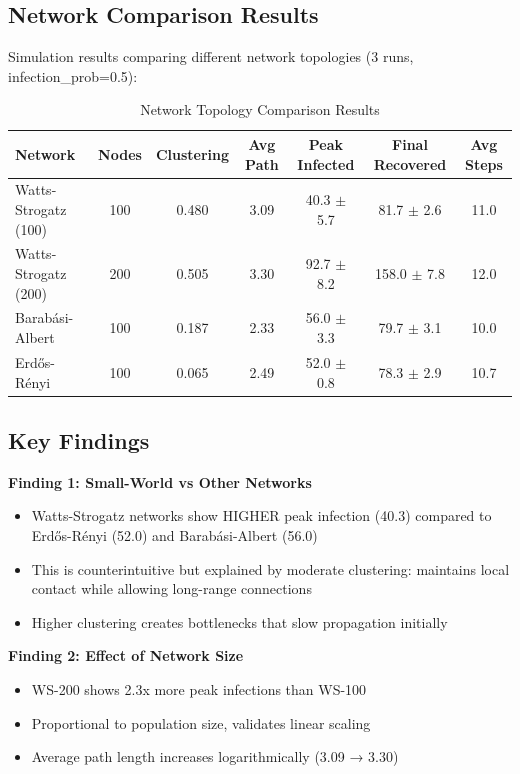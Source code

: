 \documentclass[12pt,a4paper]{article}
\begin{document}
\subsection{Network Comparison Results}

Simulation results comparing different network topologies (3 runs, infection\_prob=0.5):

\begin{table}[h]
\centering
\begin{tabular}{lcccccc}
\toprule
\textbf{Network} & \textbf{Nodes} & \textbf{Clustering} & \textbf{Avg Path} & \textbf{Peak Infected} & \textbf{Final Recovered} & \textbf{Avg Steps} \\
\midrule
Watts-Strogatz (100) & 100 & 0.480 & 3.09 & 40.3 $\pm$ 5.7 & 81.7 $\pm$ 2.6 & 11.0 \\
Watts-Strogatz (200) & 200 & 0.505 & 3.30 & 92.7 $\pm$ 8.2 & 158.0 $\pm$ 7.8 & 12.0 \\
Barabási-Albert & 100 & 0.187 & 2.33 & 56.0 $\pm$ 3.3 & 79.7 $\pm$ 3.1 & 10.0 \\
Erdős-Rényi & 100 & 0.065 & 2.49 & 52.0 $\pm$ 0.8 & 78.3 $\pm$ 2.9 & 10.7 \\
\bottomrule
\end{tabular}
\caption{Network Topology Comparison Results}
\end{table}

\subsection{Key Findings}

\textbf{Finding 1: Small-World vs Other Networks}
\begin{itemize}
    \item Watts-Strogatz networks show HIGHER peak infection (40.3) compared to Erdős-Rényi (52.0) and Barabási-Albert (56.0)
    \item This is counterintuitive but explained by moderate clustering: maintains local contact while allowing long-range connections
    \item Higher clustering creates bottlenecks that slow propagation initially
\end{itemize}

\textbf{Finding 2: Effect of Network Size}
\begin{itemize}
    \item WS-200 shows 2.3x more peak infections than WS-100
    \item Proportional to population size, validates linear scaling
    \item Average path length increases logarithmically (3.09 → 3.30)
\end{itemize}
\end{document}
